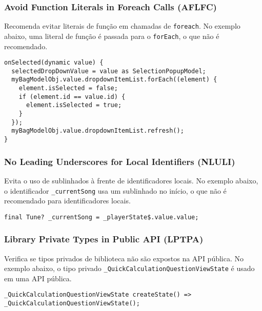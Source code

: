 \documentclass[12pt]{article}
\begin{document}
\subsubsection{Avoid Function Literals in Foreach Calls (AFLFC)}
Recomenda evitar literais de função em chamadas de \texttt{foreach}. No exemplo abaixo, uma literal de função é passada para o \texttt{forEach}, o que não é recomendado.

\begin{tcolorbox}[codeSnippetStyle={Grocery-App/lib/presentation/my\_bag\_page/controller/my\_bag\_controller.dart}]
\begin{verbatim}
onSelected(dynamic value) { 
  selectedDropDownValue = value as SelectionPopupModel; 
  myBagModelObj.value.dropdownItemList.forEach((element) {
    element.isSelected = false; 
    if (element.id == value.id) {
      element.isSelected = true;
    }
  });
  myBagModelObj.value.dropdownItemList.refresh(); 
}
\end{verbatim}
\end{tcolorbox}

\subsubsection{No Leading Underscores for Local Identifiers (NLULI)}
Evita o uso de sublinhados à frente de identificadores locais. No exemplo abaixo, o identificador \texttt{\_currentSong} usa um sublinhado no início, o que não é recomendado para identificadores locais.

\begin{tcolorbox}[codeSnippetStyle={flutter-tunein/lib/services/musicService.dart}]
\begin{verbatim}
final Tune? _currentSong = _playerState$.value.value;
\end{verbatim}
\end{tcolorbox}

\subsubsection{Library Private Types in Public API (LPTPA)}
Verifica se tipos privados de biblioteca não são expostos na API pública. No exemplo abaixo, o tipo privado \texttt{\_QuickCalculationQuestionViewState} é usado em uma API pública.

\begin{tcolorbox}[codeSnippetStyle={math-metrix/lib/src/ui/quickCalculation/quick\_calculation\_question\_view.dart}]
\begin{verbatim}
_QuickCalculationQuestionViewState createState() => _QuickCalculationQuestionViewState();
\end{verbatim}
\end{tcolorbox}
\end{document}
